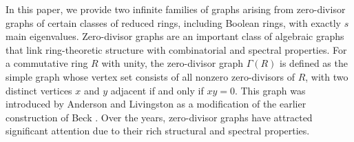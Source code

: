 \documentclass[11pt,oneside]{article}
\theoremstyle{plain}
\theoremstyle{plain}
\theoremstyle{definition}
\numberwithin{figure}{section}
\theoremstyle{remark}
\numberwithin{equation}{section}
\begin{document}
	
	
	In this paper, we provide two infinite families of  graphs arising from zero-divisor graphs of certain classes of reduced rings, including Boolean rings, with exactly \(s\) main eigenvalues. Zero-divisor graphs are an important class of algebraic graphs that link ring-theoretic structure with combinatorial and spectral properties. For a commutative ring $R$ with unity, the zero-divisor graph $\Gamma(R)$ is defined as the simple graph whose vertex set consists of all nonzero zero-divisors of $R$, with two distinct vertices $x$ and $y$ adjacent if and only if $xy=0$. This graph was introduced by Anderson and Livingston \cite{anderson} as a modification of the earlier construction of Beck \cite{beck}. Over the years, zero-divisor graphs have attracted significant attention due to their rich structural and spectral properties.
	
\end{document}
